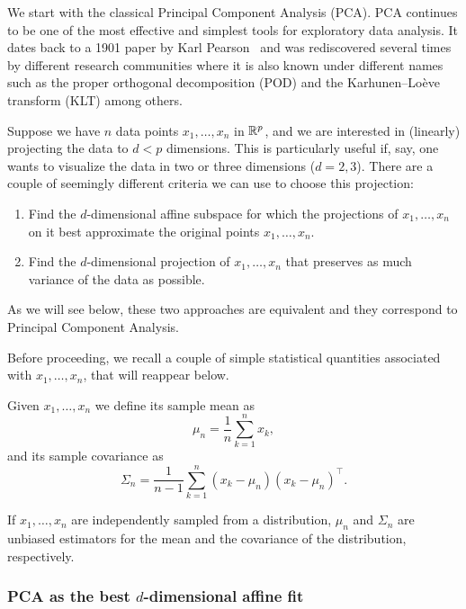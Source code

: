 We start with the classical Principal Component Analysis (PCA). PCA continues to be one of the most effective and simplest tools for exploratory data analysis. It dates back to a 1901 paper by Karl Pearson~\cite{Pearson_PCA_1901} and was rediscovered several times by different research communities where it is also known under different names such as the proper orthogonal decomposition (POD) and the Karhunen–Lo\`eve transform (KLT) among others.

Suppose we have $n$ data points $x_1,\dots,x_n$ in $\mathbb{R}^p$, and we are interested in (linearly) projecting the data to $d< p$ dimensions. This is particularly useful if, say, one wants to visualize the data in two or three dimensions ($d=2, 3$). There are a couple of seemingly different criteria we can use to choose this projection:

\begin{enumerate}
 \item Find the $d$-dimensional affine subspace for which the projections of $x_1,\dots,x_n$ on it best approximate the original points $x_1,\dots,x_n$.

 \item Find the $d$-dimensional projection of $x_1,\dots,x_n$ that preserves as much variance of the data as possible.
\end{enumerate}

As we will see below, these two approaches are equivalent and they correspond to Principal Component Analysis.

Before proceeding, we recall a couple of simple statistical quantities associated with $x_1,\dots,x_n$, that will reappear below.

Given $x_1,\dots,x_n$ we define its sample mean as
\begin{equation}
 \mu_n = \frac1{n}\sum_{k=1}^n x_k,
\end{equation}
and its sample covariance as
\begin{equation}
 \Sigma_n = \frac1{n-1}\sum_{k=1}^n \left(x_k-\mu_n\right)\left(x_k-\mu_n\right)^\top  .
\end{equation}

\begin{remark}
If $x_1,\dots, x_n$ are independently sampled from a distribution, $\mu_n$ and $\Sigma_n$ are unbiased estimators for the mean and the covariance of the distribution, respectively.
\end{remark}


\subsubsection{PCA as the best $d$-dimensional affine fit}


